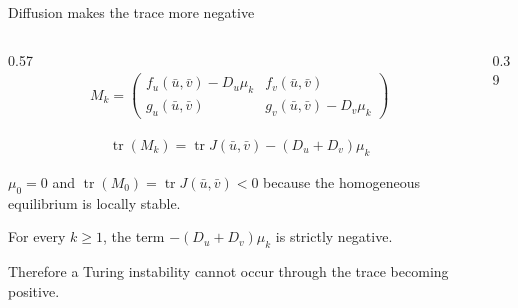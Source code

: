 \begin{frame}{Diffusion makes the trace more negative}

  \vspace{-0.08cm}

  \begin{columns}[c,onlytextwidth]

    \begin{column}{0.57\textwidth}
      {\color{HydraWhite}\fontsize{10.2}{13}\selectfont
      \begin{align*}
        M_k
        =
        \begin{pmatrix}
          f_u(\bar u,\bar v)-D_u\mu_k&f_v(\bar u,\bar v)\\
          g_u(\bar u,\bar v)&g_v(\bar u,\bar v)-D_v\mu_k
        \end{pmatrix}
      \end{align*}
      }

      \vspace{-0.20cm}

      {\color{HydraWhite}\bfseries\fontsize{12.2}{15.2}\selectfont
      \begin{align*}
        \boxed{
          \operatorname{tr}(M_k)
          =
          \operatorname{tr}J(\bar u,\bar v)
          -
          (D_u+D_v)\mu_k
        }
      \end{align*}
      }

      \vspace{-0.16cm}

        {$\mu_0=0$ and $\operatorname{tr}(M_0)=\operatorname{tr}J(\bar u,\bar v)<0$ because the homogeneous equilibrium is locally stable.}

      \vspace{0.12cm}

        {For every $k\geq1$, the term $-(D_u+D_v)\mu_k$ is strictly negative.}

      \vspace{-0.08cm}

      {\color{HydraMuted}\fontsize{7.8}{9.5}\selectfont
        Therefore a Turing instability cannot occur through the trace becoming positive.
      \par}
    \end{column}

    \begin{column}{0.39\textwidth}
      \centering


\end{column}
\end{columns}
\end{frame}
